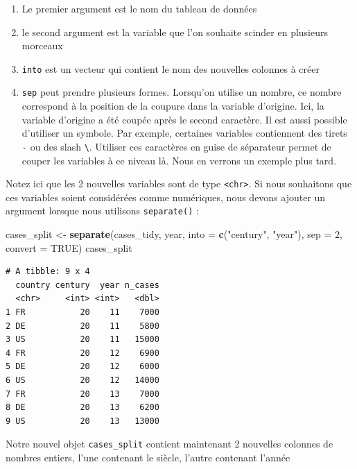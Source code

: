 \documentclass[a4paperpaper,]{article}
\newenvironment{Shaded}{\begin{snugshade}}{\end{snugshade}}
\newcommand{\DataTypeTok}[1]{\textcolor[rgb]{0.00,0.34,0.68}{#1}}
\newcommand{\DecValTok}[1]{\textcolor[rgb]{0.69,0.50,0.00}{#1}}
\newcommand{\KeywordTok}[1]{\textcolor[rgb]{0.12,0.11,0.11}{\textbf{#1}}}
\newcommand{\NormalTok}[1]{\textcolor[rgb]{0.12,0.11,0.11}{#1}}
\newcommand{\OtherTok}[1]{\textcolor[rgb]{0.00,0.43,0.16}{#1}}
\newcommand{\StringTok}[1]{\textcolor[rgb]{0.75,0.01,0.01}{#1}}
\providecommand{\tightlist}{%
  \setlength{\itemsep}{0pt}\setlength{\parskip}{0pt}}
\begin{document}
\begin{enumerate}
\def\labelenumi{\arabic{enumi}.}
\tightlist
\item
  Le premier argument est le nom du tableau de données
\item
  le second argument est la variable que l'on souhaite scinder en plusieurs morceaux
\item
  \texttt{into} est un vecteur qui contient le nom des nouvelles colonnes à créer
\item
  \texttt{sep} peut prendre plusieurs formes. Lorsqu'on utilise un nombre, ce nombre correspond à la position de la coupure dans la variable d'origine. Ici, la variable d'origine a été coupée après le second caractère. Il est aussi possible d'utiliser un symbole. Par exemple, certaines variables contiennent des tirets \texttt{-} ou des slash \texttt{\textbackslash{}}. Utiliser ces caractères en guise de séparateur permet de couper les variables à ce niveau là. Nous en verrons un exemple plus tard.
\end{enumerate}

Notez ici que les 2 nouvelles variables sont de type \texttt{\textless{}chr\textgreater{}}. Si nous souhaitons que ces variables soient considérées comme numériques, nous devons ajouter un argument lorsque nous utilisons \texttt{separate()} :

\begin{Shaded}
\begin{Highlighting}[]
\NormalTok{cases_split <-}\StringTok{ }\KeywordTok{separate}\NormalTok{(cases_tidy, year, }\DataTypeTok{into =} \KeywordTok{c}\NormalTok{(}\StringTok{"century"}\NormalTok{, }\StringTok{"year"}\NormalTok{), }
    \DataTypeTok{sep =} \DecValTok{2}\NormalTok{, }\DataTypeTok{convert =} \OtherTok{TRUE}\NormalTok{)}
\NormalTok{cases_split}
\end{Highlighting}
\end{Shaded}

\begin{verbatim}
# A tibble: 9 x 4
  country century  year n_cases
  <chr>     <int> <int>   <dbl>
1 FR           20    11    7000
2 DE           20    11    5800
3 US           20    11   15000
4 FR           20    12    6900
5 DE           20    12    6000
6 US           20    12   14000
7 FR           20    13    7000
8 DE           20    13    6200
9 US           20    13   13000
\end{verbatim}

Notre nouvel objet \texttt{cases\_split} contient maintenant 2 nouvelles colonnes de nombres entiers, l'une contenant le siècle, l'autre contenant l'année
\end{document}
